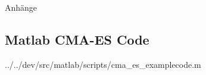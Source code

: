 %
%
%
%

\begin{appendix}
\newpage
\huge{Anhänge}
\normalsize

\newpage
\begin{landscape}
\section{Matlab CMA-ES Code}
\label{lst:cmaes-mat-code}



		{../../dev/src/matlab/scripts/cma_es_examplecode.m}

\end{landscape}

%
%
%

\end{appendix}
